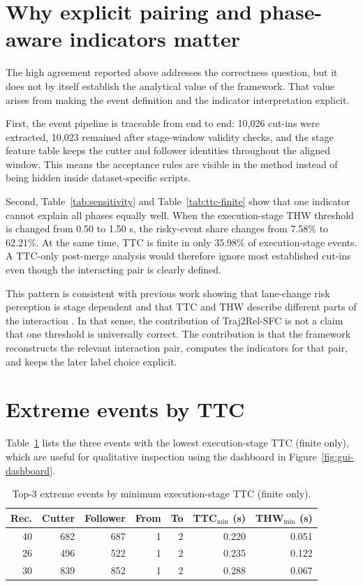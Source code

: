 \documentclass[12pt,a4paper,twoside,openright]{report}
\newcommand{\FrameworkName}{Traj2Rel-SFC}
\begin{document}
    \section{Why explicit pairing and phase-aware indicators matter}
    The high agreement reported above addresses the correctness question, but it does not by itself establish the analytical value of the framework. That value arises from making the event definition and the indicator interpretation explicit.

    First, the event pipeline is traceable from end to end: 10,026 cut-ins were extracted, 10,023 remained after stage-window validity checks, and the stage feature table keeps the cutter and follower identities throughout the aligned window. This means the acceptance rules are visible in the method instead of being hidden inside dataset-specific scripts.

    Second, Table~\ref{tab:sensitivity} and Table~\ref{tab:ttc-finite} show that one indicator cannot explain all phases equally well. When the execution-stage THW threshold is changed from 0.50 to 1.50 s, the risky-event share changes from 7.58\% to 62.21\%. At the same time, TTC is finite in only 35.98\% of execution-stage events. A TTC-only post-merge analysis would therefore ignore most established cut-ins even though the interacting pair is clearly defined.

    This pattern is consistent with previous work showing that lane-change risk perception is stage dependent and that TTC and THW describe different parts of the interaction \cite{zhou2016riskperception,wang2021ssm}. In that sense, the contribution of \FrameworkName{} is not a claim that one threshold is universally correct. The contribution is that the framework reconstructs the relevant interaction pair, computes the indicators for that pair, and keeps the later label choice explicit.

    \section{Extreme events by TTC}
    Table~\ref{tab:top-ttc} lists the three events with the lowest execution-stage TTC (finite only), which are useful for qualitative inspection using the dashboard in Figure~\ref{fig:gui-dashboard}.

    \begin{table}[H]
        \centering
        \caption{Top-3 extreme events by minimum execution-stage TTC (finite only).}
        \label{tab:top-ttc}
        \begin{tabular}{@{}rrrrrrr@{}}
            \toprule
            Rec. & Cutter & Follower & From & To & TTC$_{\min}$ (s) & THW$_{\min}$ (s) \\
            \midrule
            40 & 682 & 687 & 1 & 2 & 0.220 & 0.051 \\
            26 & 496 & 522 & 1 & 2 & 0.235 & 0.122 \\
            30 & 839 & 852 & 1 & 2 & 0.288 & 0.067 \\
            \bottomrule
        \end{tabular}
    \end{table}
\end{document}
